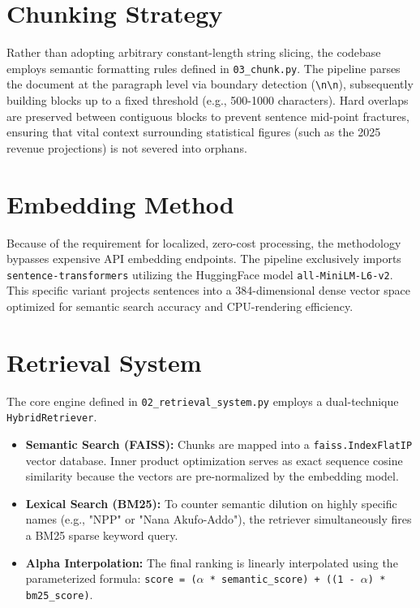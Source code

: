 \documentclass[12pt, a4paper]{article}
\begin{document}
\section{Chunking Strategy}
Rather than adopting arbitrary constant-length string slicing, the codebase employs semantic formatting rules defined in \texttt{03\_chunk.py}. The pipeline parses the document at the paragraph level via boundary detection (\texttt{\textbackslash n\textbackslash n}), subsequently building blocks up to a fixed threshold (e.g., 500-1000 characters). Hard overlaps are preserved between contiguous blocks to prevent sentence mid-point fractures, ensuring that vital context surrounding statistical figures (such as the 2025 revenue projections) is not severed into orphans.

\section{Embedding Method}
Because of the requirement for localized, zero-cost processing, the methodology bypasses expensive API embedding endpoints. The pipeline exclusively imports \texttt{sentence-transformers} utilizing the HuggingFace model \texttt{all-MiniLM-L6-v2}. This specific variant projects sentences into a 384-dimensional dense vector space optimized for semantic search accuracy and CPU-rendering efficiency.

\section{Retrieval System}
The core engine defined in \texttt{02\_retrieval\_system.py} employs a dual-technique \texttt{HybridRetriever}.
\begin{itemize}
    \item \textbf{Semantic Search (FAISS):} Chunks are mapped into a \texttt{faiss.IndexFlatIP} vector database. Inner product optimization serves as exact sequence cosine similarity because the vectors are pre-normalized by the embedding model.
    \item \textbf{Lexical Search (BM25):} To counter semantic dilution on highly specific names (e.g., "NPP" or "Nana Akufo-Addo"), the retriever simultaneously fires a BM25 sparse keyword query. 
    \item \textbf{Alpha Interpolation:} The final ranking is linearly interpolated using the parameterized formula: \texttt{score = ($\alpha$ * semantic\_score) + ((1 - $\alpha$) * bm25\_score)}.
\end{itemize}
\end{document}
